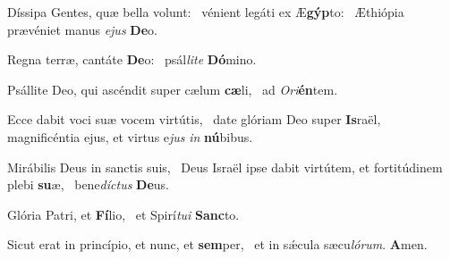 \item Díssipa Gentes, quæ bella volunt:~\pscross{} vénient legáti ex Æ\textbf{gýp}to:~\psstar{} Æthiópia prævéniet manus \textit{ejus} \textbf{De}o.
\item Regna terræ, cantáte \textbf{De}o:~\psstar{} psál\textit{lite} \textbf{Dó}mino.
\item Psállite Deo, qui ascéndit super cælum \textbf{cæ}li,~\psstar{} ad \textit{Ori}\textbf{én}tem.
\item Ecce dabit voci suæ vocem virtútis,~\pscross{} date glóriam Deo super \textbf{Is}raël,~\psstar{} magnificéntia ejus, et virtus e\textit{jus} \textit{in} \textbf{nú}bibus.
\item Mirábilis Deus in sanctis suis,~\pscross{} Deus Israël ipse dabit virtútem, et fortitúdinem plebi \textbf{su}æ,~\psstar{} bene\textit{díctus} \textbf{De}us.
\item Glória Patri, et \textbf{Fí}lio,~\psstar{} et Spirí\textit{tui} \textbf{Sanc}to.
\item Sicut erat in princípio, et nunc, et \textbf{sem}per,~\psstar{} et in sǽcula sæcu\textit{lórum}. \textbf{A}men.
